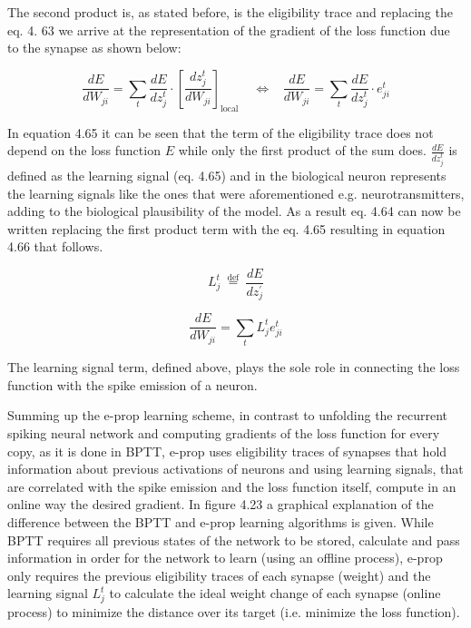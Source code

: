 \documentclass[12pt]{report}
\begin{document}
The second product is, as stated before, is the eligibility trace and replacing the eq. 4. 63 we arrive at the representation of the gradient of the loss function due to the synapse as shown below:

\begin{equation}
    \frac{d E}{d W_{j i}}=\sum_{t} \frac{d E}{d z_{j}^{t}} \cdot\left[\frac{d z_{j}^{t}}{d W_{j i}}\right]_{\text {local }}
    \;\;\; \Longleftrightarrow \;\;\;
    \frac{d E}{d W_{j i}}=\sum_{t} \frac{d E}{d z_{j}^{t}} \cdot e_{ji}^t
\end{equation}

In equation 4.65 it can be seen that the term of the eligibility trace does not depend on the loss function \(E\) while only the first product of the sum does. \(\frac{dE}{dz_j^t}\) is defined as the learning signal (eq. 4.65) and in the biological neuron represents the learning signals like the ones that were aforementioned e.g. neurotransmitters, adding to the biological plausibility of the model. As a result eq. 4.64 can now be written replacing the first product term with the eq. 4.65 resulting in equation 4.66 that follows.

\begin{equation}
    L_{j}^{t} \stackrel{\text { def }}{=} \frac{d E}{d z_{j}^{\prime}}
\end{equation}

\begin{equation}
    \frac{d E}{d W_{j i}}=\sum_{t} L_{j}^{t} e_{j i}^{t}
\end{equation}

The learning signal term, defined above, plays the sole role in connecting the loss function with the spike emission of a neuron. 

Summing up the e-prop learning scheme, in contrast to unfolding the recurrent spiking neural network and computing gradients of the loss function for every copy, as it is done in BPTT, e-prop uses eligibility traces of synapses that hold information about previous activations of neurons and using learning signals, that are correlated with the spike emission and the loss function itself, compute in an online way the desired gradient. In figure 4.23 a graphical explanation of the difference between the BPTT and e-prop learning algorithms is given. While BPTT requires all previous states of the network to be stored, calculate and pass information in order for the network to learn (using an offline process), e-prop only requires the previous eligibility traces of each synapse (weight) and the learning signal \(L_j^t\) to calculate the ideal weight change of each synapse (online process) to minimize the distance over its target (i.e. minimize the loss function). 
\end{document}
